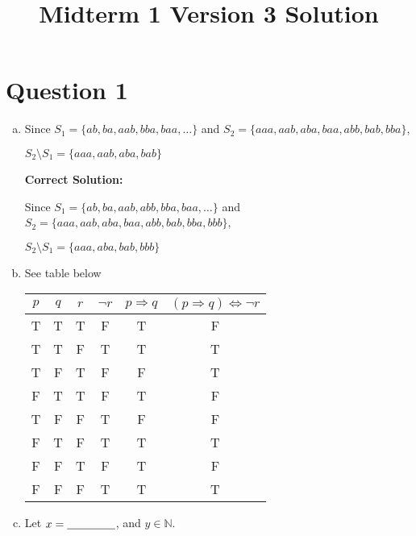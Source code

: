 \documentclass[12pt]{article}
\begin{document}
\title{Midterm 1 Version 3 Solution}
\maketitle

\section*{Question 1}
\begin{enumerate}[a.]
    \item

    Since $S_1 = \{ab,ba,aab,bba,baa,\dots\}$ and $S_2=\{aaa,aab,aba,baa,abb,bab,
    bba\}$,

    \bigskip

    $S_2 \setminus S_1 = \{aaa,aab,aba,bab\}$

    \bigskip

    \textbf{Correct Solution:}

    Since $S_1 = \{ab,ba,aab,abb,bba,baa,\dots\}$ and $S_2=\{aaa,aab,aba,baa,abb,bab,
    bba,bbb\}$,

    $S_2 \setminus S_1 = \{aaa,aba,bab,bbb\}$

    \item

    See table below

    \begin{tabular}{c|c|c|c|c|c}
        $p$ & $q$ & $r$ & $\neg r$ & $p \Rightarrow q$ & $(p \Rightarrow q) \Leftrightarrow \neg r$\\
        \hline
        T & T & T & F & T & F\\
        \hline
        T & T & F & T & T & T\\
        \hline
        T & F & T & F & F & T\\
        \hline
        F & T & T & F & T & F\\
        \hline
        T & F & F & T & F & F\\
        \hline
        F & T & F & T & T & T\\
        \hline
        F & F & T & F & T & F\\
        \hline
        F & F & F & T & T & T
    \end{tabular}

    \item

    Let $x = \underline{\hspace{1.5cm}}$, and $y \in \mathbb{N}$.

    \bigskip


\end{enumerate}
\end{document}
